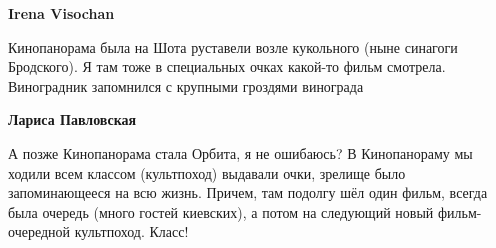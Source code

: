 \begin{itemize}
\begin{itemize}
\begin{itemize}
\textbf{Irena Visochan} 

Кинопанорама была на Шота руставели возле кукольного (ныне синагоги Бродского).
Я там тоже в специальных очках какой-то фильм смотрела. Виноградник запомнился
с крупными гроздями винограда

\textbf{Лариса Павловская} 

А позже Кинопанорама стала Орбита, я не ошибаюсь? В Кинопанораму мы ходили всем
классом (культпоход) выдавали очки, зрелище было запоминающееся на всю
жизнь. Причем, там подолгу шёл один фильм, всегда была очередь (много гостей
киевских), а потом на следующий новый фильм-очередной культпоход. Класс!

\end{itemize} %

\end{itemize} %

\end{itemize} %
